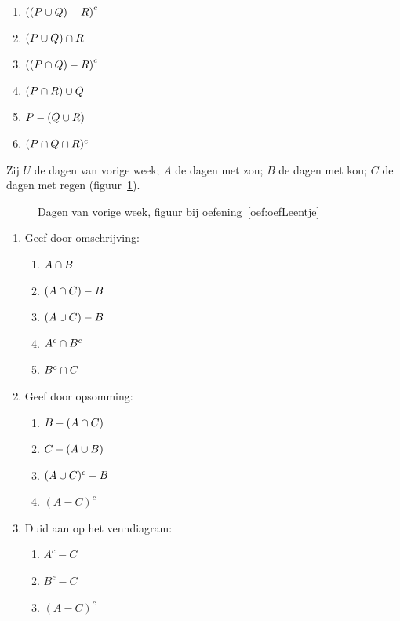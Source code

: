 \begin{oef}
\begin{opl}
\begin{enumerate}
\item $\left(\left(P\cup Q\right)-R\right)^c$
\item $\left(P\cup Q\right) \cap R$
\item $\left(\left(P\cap Q\right)-R\right)^c$
\item $(P\cap R)\cup Q$
\item $P-(Q\cup R)$
\item $(P\cap Q \cap R)^c$
\end{enumerate}
\end{opl}
\end{oef}

\begin{oef}
\label{oef:oefLeentje}
%
Zij $U$ de dagen van vorige week; $A$ de dagen met zon; $B$ de dagen met kou; $C$ de dagen met regen (figuur~\ref{fig:dagen}).
\begin{figure}[htbp]
\centering

\caption{Dagen van vorige week, figuur bij oefening~\ref{oef:oefLeentje}}
\label{fig:dagen}
\end{figure}
\begin{enumerate}
\item Geef door omschrijving:
\begin{enumerate}
\item $A\cap B$
\item $(A\cap C)-B$
\item $(A\cup C)-B$
\item $A^c\cap B^c$
\item $B^c\cap C$
\end{enumerate}
\item Geef door opsomming:
\begin{enumerate}
\item $B-(A\cap C)$
\item $C-(A\cup B)$
\item $(A\cup C)^c-B$
\item $(A-C)^c$
\end{enumerate}
\item Duid aan op het venndiagram:
\begin{enumerate}
\item $A^c-C$
\item $B^c -C$
\item $(A-C)^c$
\end{enumerate}
\end{enumerate}


\end{oef}
